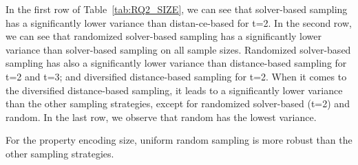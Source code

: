 In the first row of Table~\ref{tab:RQ2_SIZE}, we can see that solver-based sampling has a significantly lower variance than distan-ce-based for t=2.
In the second row, we can see that randomized solver-based sampling has a significantly lower variance than solver-based sampling on all sample sizes.
Randomized solver-based sampling has also a significantly lower variance than distance-based sampling for t=2 and t=3; and diversified distance-based sampling for t=2.
When it comes to the diversified distance-based sampling, it leads to a significantly lower variance than the other sampling strategies, except for randomized solver-based (t=2) and random.
In the last row, we observe that random has the lowest variance. %

\begin{tcolorbox}
For the property encoding size, uniform random sampling is more robust than the other sampling strategies.
\end{tcolorbox}

